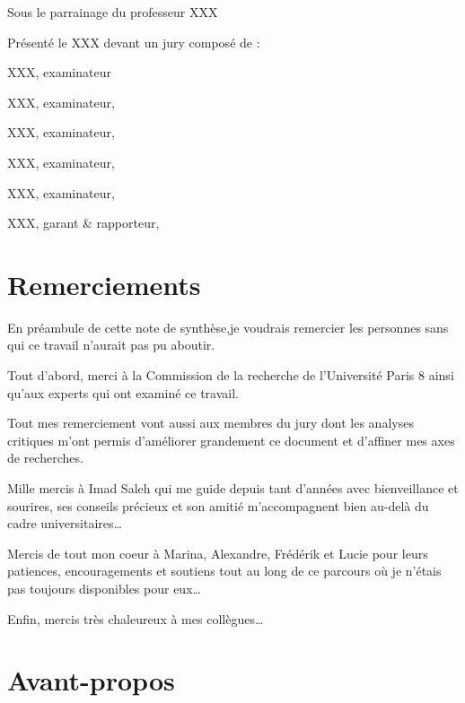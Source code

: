 \documentclass[
  a4paper,
  DIV=11,
  numbers=noendperiod]{scrreprt}
\begin{document}

Sous le parrainage du professeur XXX

Présenté le XXX devant un jury composé de :

XXX, examinateur

XXX, examinateur,

XXX, examinateur,

XXX, examinateur,

XXX, examinateur,

XXX, garant \& rapporteur,


\chapter*{Remerciements}\label{sec-remerciements}


En préambule de cette note de synthèse,je voudrais remercier les
personnes sans qui ce travail n'aurait pas pu aboutir.

Tout d'abord, merci à la Commission de la recherche de l'Université
Paris 8 ainsi qu'aux experts qui ont examiné ce travail.

Tout mes remerciement vont aussi aux membres du jury dont les analyses
critiques m'ont permis d'améliorer grandement ce document et d'affiner
mes axes de recherches.

Mille mercis à Imad Saleh qui me guide depuis tant d'années avec
bienveillance et sourires, ses conseils précieux et son amitié
m'accompagnent bien au-delà du cadre universitaires\ldots{}

Mercis de tout mon coeur à Marina, Alexandre, Frédérik et Lucie pour
leurs patiences, encouragements et soutiens tout au long de ce parcours
où je n'étais pas toujours disponibles pour eux\ldots{}

Enfin, mercis très chaleureux à mes collègues\ldots{}


\chapter{Avant-propos}\label{sec-avantpropos}
\end{document}
